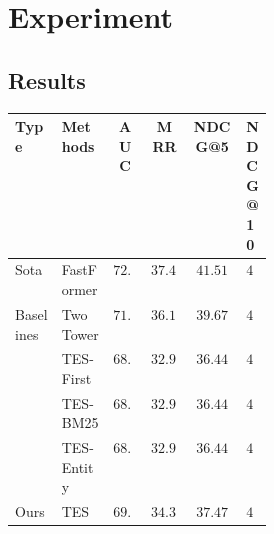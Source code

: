 \documentclass[sigconf,anonymous]{acmart}
\begin{document}
\section{Experiment}
\subsection{Results}

\begin{table}
  \centering
  \begin{tabular}{lp{0.2\linewidth}cccp{0.1\linewidth}}
    \toprule
    \textbf{Type} & \textbf{Methods}&\textbf{AUC}&\textbf{MRR}&\textbf{NDCG@5}&\textbf{NDCG@10}\\
    \midrule
    \multirow{1}{0.15\linewidth}{Sota}
    &FastFormer & $\mathbf{72.68}$ & $\mathbf{37.45}$ & $\mathbf{41.51}$ & $\mathbf{46.84}$\\
    \midrule
    \multirow{4}{0.15\linewidth}{Baselines}
    &Two Tower& ${71.43}$ & ${36.16}$ & ${39.67}$ & ${45.29}$\\
    &TES-First & ${68.00}$ & ${32.91}$ & ${36.44}$ & ${42.86}$\\
    &TES-BM25 & ${68.00}$ & ${32.91}$ & ${36.44}$ & ${42.86}$\\
    &TES-Entity & ${68.00}$ & ${32.91}$ & ${36.44}$ & ${42.86}$\\
    \midrule
    \multirow{1}{0.15\linewidth}{Ours}
    &TES & $69.62$ & $34.30$ & ${37.47}$ & ${43.21}$\\
    \bottomrule
  \end{tabular}
\end{table}
\clearpage



\end{document}
